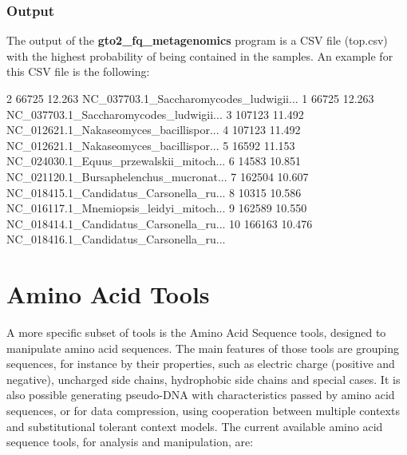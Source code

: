 \documentclass[11pt,]{krantz}
\newenvironment{Shaded}{\begin{snugshade}}{\end{snugshade}}
\newcommand{\ExtensionTok}[1]{#1}
\newcommand{\NormalTok}[1]{#1}
\begin{document}
\subsection*{Output}\label{output-26}


The output of the \textbf{gto2\_fq\_metagenomics} program is a CSV file
(top.csv) with the highest probability of being contained in the
samples. An example for this CSV file is the following:

\begin{Shaded}
\begin{Highlighting}[]
\ExtensionTok{2}\NormalTok{  66725   12.263   NC_037703.1_Saccharomycodes_ludwigii...}
\ExtensionTok{1}\NormalTok{  66725   12.263   NC_037703.1_Saccharomycodes_ludwigii...}
\ExtensionTok{3}\NormalTok{  107123  11.492   NC_012621.1_Nakaseomyces_bacillispor...}
\ExtensionTok{4}\NormalTok{  107123  11.492   NC_012621.1_Nakaseomyces_bacillispor...}
\ExtensionTok{5}\NormalTok{  16592   11.153   NC_024030.1_Equus_przewalskii_mitoch...}
\ExtensionTok{6}\NormalTok{  14583   10.851   NC_021120.1_Bursaphelenchus_mucronat...}
\ExtensionTok{7}\NormalTok{  162504  10.607   NC_018415.1_Candidatus_Carsonella_ru...}
\ExtensionTok{8}\NormalTok{  10315   10.586   NC_016117.1_Mnemiopsis_leidyi_mitoch...}
\ExtensionTok{9}\NormalTok{  162589  10.550   NC_018414.1_Candidatus_Carsonella_ru...}
\ExtensionTok{10}\NormalTok{ 166163  10.476   NC_018416.1_Candidatus_Carsonella_ru...}
\end{Highlighting}
\end{Shaded}

\chapter{Amino Acid Tools}\label{amino-acid-tools}

A more specific subset of tools is the Amino Acid Sequence tools,
designed to manipulate amino acid sequences. The main features of those
tools are grouping sequences, for instance by their properties, such as
electric charge (positive and negative), uncharged side chains,
hydrophobic side chains and special cases. It is also possible
generating pseudo-DNA with characteristics passed by amino acid
sequences, or for data compression, using cooperation between multiple
contexts and substitutional tolerant context models. The current
available amino acid sequence tools, for analysis and manipulation, are:
\end{document}
